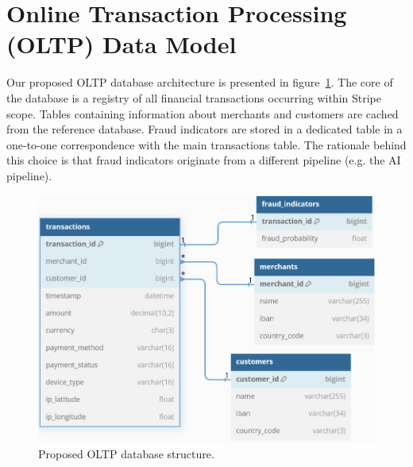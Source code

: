 \documentclass[11pt,a4paper,computermodern]{article}
\begin{document}
\section*{Online Transaction Processing (OLTP) Data Model}

Our proposed OLTP database architecture is presented in figure~\ref{fig:OLTP}. The core of the database is a registry of all financial transactions occurring within Stripe scope. Tables containing information about merchants and customers are cached from the reference database. Fraud indicators are stored in a dedicated table in a one-to-one correspondence with the main transactions table. The rationale behind this choice is that fraud indicators originate from a different pipeline (e.g. the AI pipeline).


\begin{figure}
	\centering
	\includegraphics[scale=0.7]{./figures/OLTP}
	\caption{Proposed OLTP database structure.}
	\label{fig:OLTP}
\end{figure}
\end{document}
